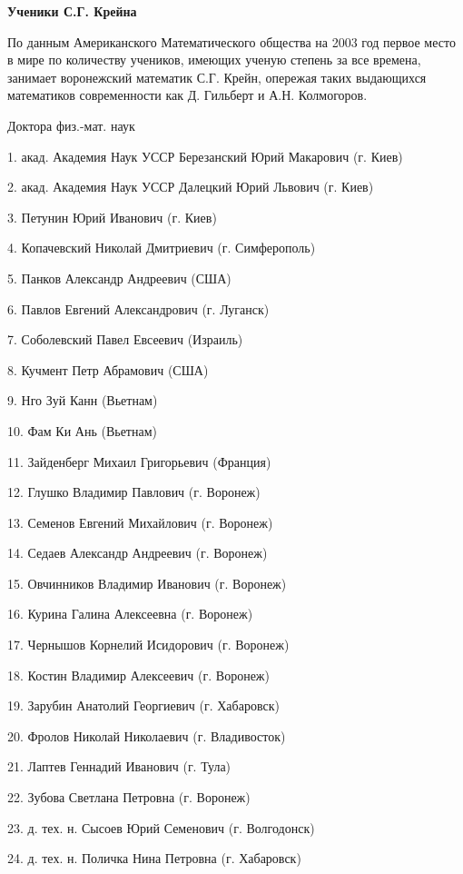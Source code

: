 \begin{center}
{\bf Ученики С.Г. Крейна}
\end{center}

По данным Американского Математического общества на 2003 год первое место в мире по количеству учеников, имеющих ученую степень за все времена, занимает воронежский математик С.Г. Крейн, опережая таких выдающихся математиков современности как Д. Гильберт и А.Н. Колмогоров.

Доктора физ.-мат. наук

1.	акад. Академия Наук УССР Березанский Юрий Макарович (г. Киев)

2.	акад. Академия Наук УССР Далецкий Юрий Львович (г. Киев)

3.	Петунин Юрий Иванович (г. Киев)

4.	Копачевский Николай Дмитриевич (г. Симферополь)

5.	Панков Александр Андреевич (США)

6.	Павлов Евгений Александрович (г. Луганск)

7.	Соболевский Павел Евсеевич (Израиль)

8.	Кучмент Петр Абрамович (США)

9.	Нго Зуй Канн (Вьетнам)

10.	 Фам Ки Ань (Вьетнам)

11.	 Зайденберг Михаил Григорьевич (Франция)

12.	 Глушко Владимир Павлович (г. Воронеж)

13.	 Семенов Евгений Михайлович (г. Воронеж)

14.	 Седаев Александр Андреевич (г. Воронеж)

15.	 Овчинников Владимир Иванович (г. Воронеж)

16.	 Курина Галина Алексеевна (г. Воронеж)

17.	 Чернышов Корнелий Исидорович (г. Воронеж)

18.	 Костин Владимир Алексеевич (г. Воронеж)

19.	 Зарубин Анатолий Георгиевич (г. Хабаровск)

20.	 Фролов Николай Николаевич (г. Владивосток)

21.	 Лаптев Геннадий Иванович (г. Тула)

22.	 Зубова Светлана Петровна (г. Воронеж)

23.	 д. тех. н. Сысоев Юрий Семенович (г. Волгодонск)

24.	 д. тех. н. Поличка Нина Петровна (г. Хабаровск)

